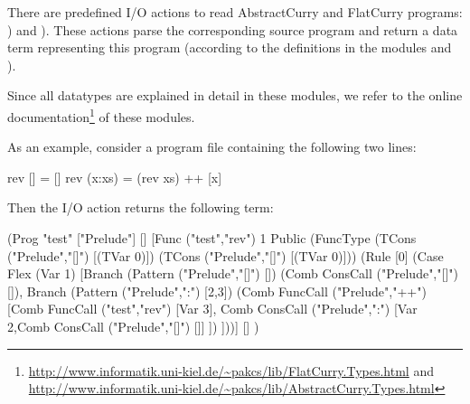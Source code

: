 {There are predefined I/O actions to read AbstractCurry and
FlatCurry programs: )
and ).
These actions parse the corresponding source program and return
a data term representing this program (according to the definitions
in the modules  and ).

Since all datatypes are explained in detail in these modules,
we refer to the online documentation\footnote{%
\url{http://www.informatik.uni-kiel.de/~pakcs/lib/FlatCurry.Types.html} and
\url{http://www.informatik.uni-kiel.de/~pakcs/lib/AbstractCurry.Types.html}}
of these modules.

As an example, consider a program file 
containing the following two lines:
\begin{curry}
rev []     = []
rev (x:xs) = (rev xs) ++ [x]
\end{curry}
Then the I/O action  returns the
following term:
\begin{curry}
 (Prog "test"
  ["Prelude"]
  []
  [Func ("test","rev") 1 Public
        (FuncType (TCons ("Prelude","[]") [(TVar 0)])
                  (TCons ("Prelude","[]") [(TVar 0)]))
        (Rule [0]
           (Case Flex (Var 1)
              [Branch (Pattern ("Prelude","[]") [])
                  (Comb ConsCall ("Prelude","[]") []),
               Branch (Pattern ("Prelude",":") [2,3])
                  (Comb FuncCall ("Prelude","++")
                        [Comb FuncCall ("test","rev") [Var 3],
                         Comb ConsCall ("Prelude",":")
                              [Var 2,Comb ConsCall ("Prelude","[]") []]
                        ])
              ]))]
  []
 )
\end{curry}



}

